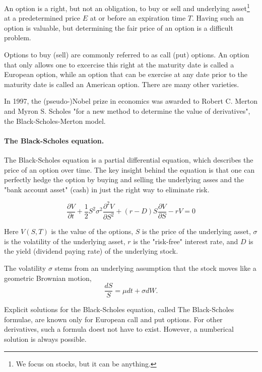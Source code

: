 \documentclass[%
oneside,                 %
final,                   %
10pt]{article}
\begin{document}
An option is a right, but not an obligation, to buy or sell 
and underlying asset\footnote{We focus on stocks, but it can be anything.} at a predetermined price $E$ at or before 
an expiration time $T$. Having such an option is valuable, but
determining the fair price of an option is a difficult problem.



Options to buy (sell) are commonly referred to as 
call (put) options. An option that only allows one to 
excercise this right at the maturity date is called a 
European option, while an option that can be exercise at any 
date prior to the maturity date is called an American option.
There are many other varieties.

In 1997, the (pseudo-)Nobel prize in economics was awarded 
to Robert C. Merton and Myron S. Scholes "for a new method
to determine the value of derivatives", the Black-Scholes-Merton
model.

\paragraph{The Black-Scholes equation.}
The Black-Scholes equation is a partial differential equation, which 
describes the price of an option over time. The key insight behind the 
equation is that one can perfectly hedge the option by 
buying and selling the underlying asses and the "bank account 
asset" (cash) in just the right way to eliminate risk.

\begin{equation}
    \frac{\partial V}{\partial t}
    + \frac{1}{2}S^2\sigma^2\frac{\partial^2 V}{\partial S^2}
    + (r - D)S\frac{\partial V}{\partial S} - r V = 0
\end{equation}

Here $V(S, T)$ is the value of the options, $S$ is the price of the 
underlying asset, $\sigma$ is the volatility of the underlying asset,
$r$ is the "risk-free" interest rate, and $D$ is the yield
(dividend paying rate) of the underlying stock.

The volatility $\sigma$ stems from an underlying assumption that 
the stock moves like a geometric Brownian motion,
\begin{equation}
    \frac{dS}{S} = \mu dt + \sigma dW.
\end{equation}

Explicit solutions for the Black-Scholes equation,
called The Black-Scholes formulae, are known only for 
European call and put options. For other derivatives, such 
a formula doest not have to exist. However, a numberical solution is 
always possible.
\end{document}
